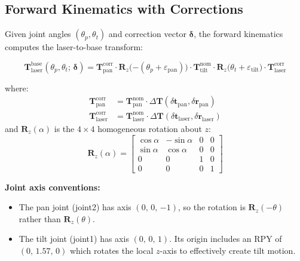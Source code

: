 \documentclass[12pt,a4paper]{article}
\newcommand{\T}{\mathbf{T}}
\newcommand{\Rz}{\mathbf{R}_z}
\begin{document}
\subsection{Forward Kinematics with Corrections}
\label{sec:fk}

Given joint angles $(\theta_p, \theta_t)$ and correction vector $\bm{\delta}$,
the forward kinematics computes the laser-to-base transform:

\begin{equation}
\boxed{
    \T_{\text{laser}}^{\text{base}}(\theta_p, \theta_t;\, \bm{\delta}) =
    \T_{\text{pan}}^{\text{corr}} \cdot
    \Rz\!\bigl({-(\theta_p + \varepsilon_{\text{pan}})}\bigr) \cdot
    \T_{\text{tilt}}^{\text{nom}} \cdot
    \Rz\!\bigl(\theta_t + \varepsilon_{\text{tilt}}\bigr) \cdot
    \T_{\text{laser}}^{\text{corr}}
}
\label{eq:fk}
\end{equation}

where:
\begin{align}
    \T_{\text{pan}}^{\text{corr}} &= \T_{\text{pan}}^{\text{nom}} \cdot \Delta\T(\delta\mathbf{t}_{\text{pan}}, \delta\mathbf{r}_{\text{pan}})
    \label{eq:T_pan_corr} \\
    \T_{\text{laser}}^{\text{corr}} &= \T_{\text{laser}}^{\text{nom}} \cdot \Delta\T(\delta\mathbf{t}_{\text{laser}}, \delta\mathbf{r}_{\text{laser}})
    \label{eq:T_laser_corr}
\end{align}
and $\Rz(\alpha)$ is the $4 \times 4$ homogeneous rotation about $z$:
\begin{equation}
    \Rz(\alpha) =
    \begin{bmatrix}
        \cos\alpha & -\sin\alpha & 0 & 0 \\
        \sin\alpha &  \cos\alpha & 0 & 0 \\
        0          &  0          & 1 & 0 \\
        0          &  0          & 0 & 1
    \end{bmatrix}
    \label{eq:Rz}
\end{equation}

\textbf{Joint axis conventions:}
\begin{itemize}[nosep]
    \item The pan joint (joint2) has axis $(0,\, 0,\, {-1})$, so the rotation
          is $\Rz(-\theta)$ rather than $\Rz(\theta)$.
    \item The tilt joint (joint1) has axis $(0,\, 0,\, 1)$. Its origin includes
          an RPY of $(0,\, 1.57,\, 0)$ which rotates the local $z$-axis to
          effectively create tilt motion.
\end{itemize}
\end{document}
